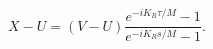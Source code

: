 \begin{equation}
\label{classical}
X-U=(V-U)\frac{e^{-iK_R\tau /M}-1}{e^{-iK_Rs/M}-1}.
\end{equation}

